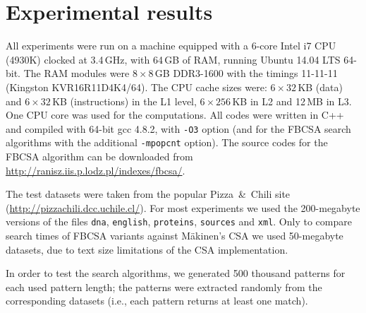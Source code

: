 \documentclass{cai}
\begin{document}
\section{Experimental results}

All experiments were run on a machine equipped with a 6-core Intel i7 CPU
(4930K) clocked at 3.4\,GHz, with 64\,GB of RAM, 
running Ubuntu 14.04 LTS 64-bit.
The RAM modules were $8 \times 8$\,GB DDR3-1600 with the timings 11-11-11 
(Kingston KVR16R11D4K4/64).
The CPU cache sizes were:
$6 \times 32$\,KB (data) and $6 \times 32$\,KB (instructions) in the L1 level,
$6 \times 256$\,KB in L2 and 12\,MB in L3.
One CPU core was used for the computations.
All codes were written in C++ and compiled with 64-bit gcc 4.8.2, 
with \texttt{-O3} option
(and for the FBCSA search algorithms with the additional \texttt{-mpopcnt} option).
The source codes for the FBCSA algorithm can be downloaded from \url{http://ranisz.iis.p.lodz.pl/indexes/fbcsa/}.

The test datasets were taken from the popular Pizza~\&~Chili 
site (\url{http://pizzachili.dcc.uchile.cl/}).
For most experiments we used the 200-megabyte versions of the files \texttt{dna},
\texttt{english}, \texttt{proteins}, \texttt{sources} and \texttt{xml}.
Only to compare search times of FBCSA variants against M{\"a}kinen's CSA
we used 50-megabyte datasets, due to text size limitations of the 
CSA implementation.

In order to test the search algorithms, we generated 500 thousand patterns 
for each used pattern length; the patterns were extracted randomly from the 
corresponding datasets (i.e., each pattern returns at least one match).
\end{document}
